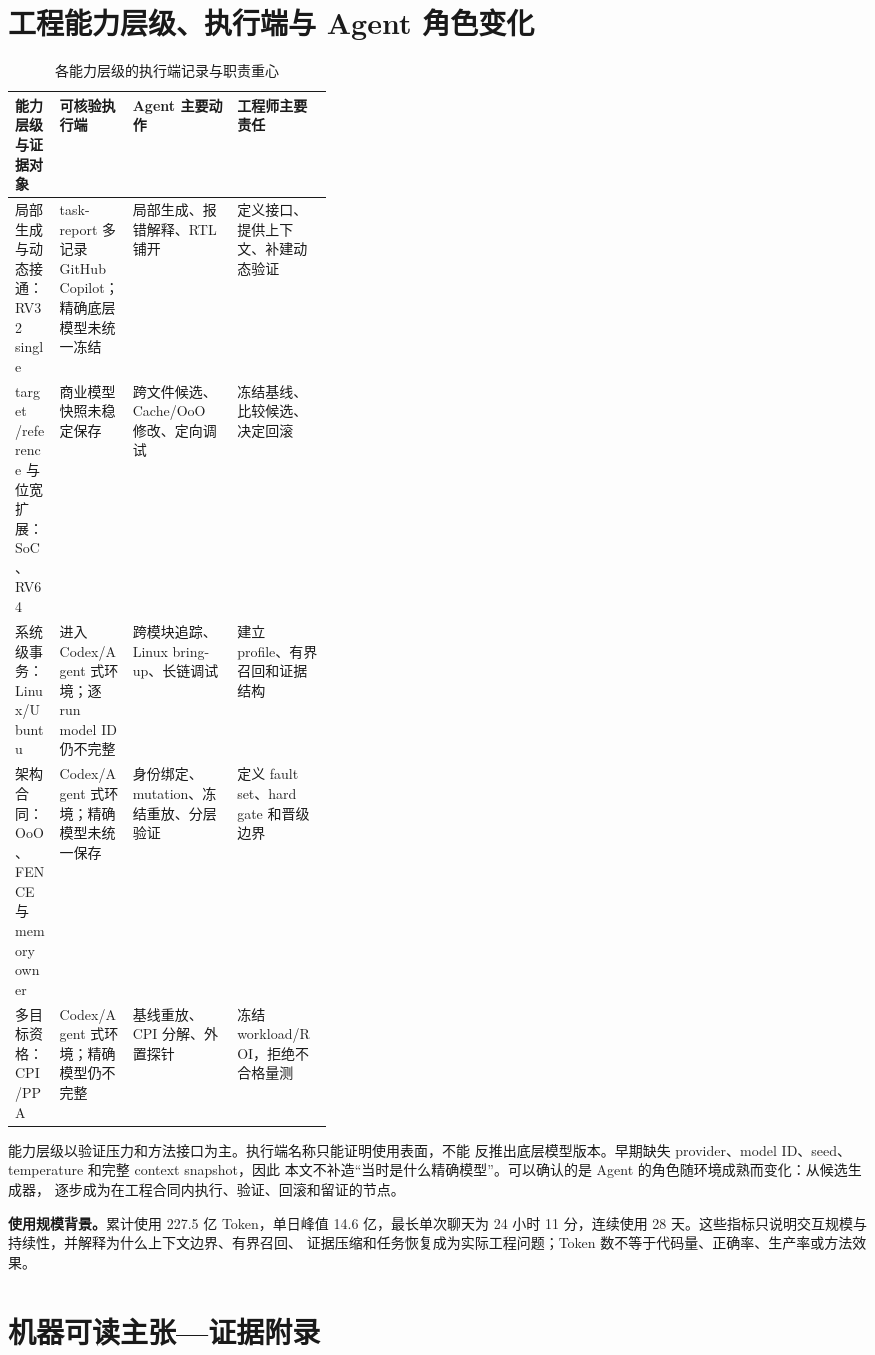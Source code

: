 \documentclass[UTF8,a4paper,zihao=-4,oneside]{ctexart}
\begin{document}
\section{工程能力层级、执行端与 Agent 角色变化}

\begin{table}[H]
  \centering
  \small
  \setlength{\tabcolsep}{3pt}
  \caption{各能力层级的执行端记录与职责重心}
  \label{tab:model-month}
  \begin{tabularx}{\linewidth}{@{}L{0.14\linewidth}L{0.23\linewidth}YY@{}}
    \toprule
    能力层级与证据对象 & 可核验执行端 & Agent 主要动作 & 工程师主要责任 \\
    \midrule
    局部生成与动态接通：RV32 single & task-report 多记录 GitHub Copilot；精确底层模型未统一冻结 &
    局部生成、报错解释、RTL 铺开 & 定义接口、提供上下文、补建动态验证 \\
    target /\allowbreak reference 与位宽扩展：SoC、RV64 & 商业模型快照未稳定保存 &
    跨文件候选、Cache/OoO 修改、定向调试 & 冻结基线、比较候选、决定回滚 \\
    系统级事务：Linux/Ubuntu & 进入 Codex/Agent 式环境；逐 run model ID 仍不完整 &
    跨模块追踪、Linux bring-up、长链调试 & 建立 profile、有界召回和证据结构 \\
    架构合同：OoO、FENCE 与 memory owner & Codex/Agent 式环境；精确模型未统一保存 &
    身份绑定、mutation、冻结重放、分层验证 & 定义 fault set、hard gate 和晋级边界 \\
    多目标资格：CPI/PPA & Codex/Agent 式环境；精确模型仍不完整 &
    基线重放、CPI 分解、外置探针 & 冻结 workload/ROI，拒绝不合格量测 \\
    \bottomrule
  \end{tabularx}
\end{table}

能力层级以验证压力和方法接口为主。执行端名称只能证明使用表面，不能
反推出底层模型版本。早期缺失 provider、model ID、seed、temperature 和完整 context snapshot，因此
本文不补造“当时是什么精确模型”。可以确认的是 Agent 的角色随环境成熟而变化：从候选生成器，
逐步成为在工程合同内执行、验证、回滚和留证的节点。

\par\medskip
\noindent\textbf{使用规模背景。}累计使用 227.5 亿 Token，单日峰值 14.6 亿，最长单次聊天为
24 小时 11 分，连续使用 28 天。这些指标只说明交互规模与持续性，并解释为什么上下文边界、有界召回、
证据压缩和任务恢复成为实际工程问题；Token 数不等于代码量、正确率、生产率或方法效果。

\section{机器可读主张---证据附录}
\label{app:claim-evidence}
\end{document}

